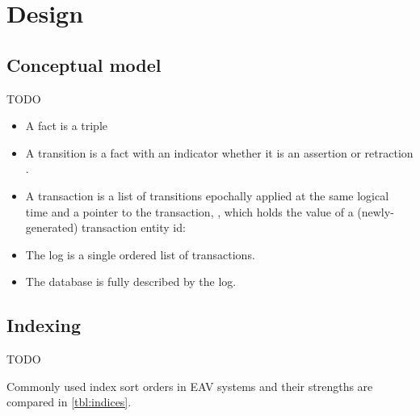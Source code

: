 \section{Design}\label{sec:design}






\subsection{Conceptual model}\label{sec:conceptual_model}

TODO

\begin{itemize}
  \item A fact is a triple \lisp{[e a v]}

  \item A transition is a fact with an indicator whether it is an assertion \lisp{[:+ e a v]} or retraction \lisp{[:- e a v]}.

  \item A transaction is a list of transitions epochally applied at the same logical time and a pointer to the transaction, , which holds the value of a (newly-generated) transaction entity id: \lisp{[[+ ... tx] [- ... tx] [+ ... tx]]}

  \item The log is a single ordered list of transactions.

  \item The database is fully described by the log.

\end{itemize}

\subsection{Indexing}

TODO

Commonly used index sort orders in EAV systems and their strengths are compared in \autoref{tbl:indices}.


